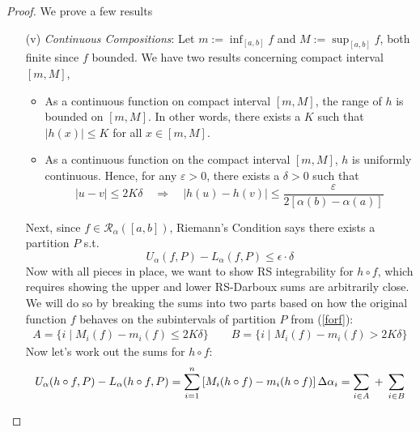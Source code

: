 \documentclass[12pt]{book}
\numberwithin{equation}{section} %
\theoremstyle{plain}
\theoremstyle{definition}
\theoremstyle{remark}
\begin{document}
\begin{proof}
We prove a few results
\begin{enumerate}[label=(\roman*)]
  \item[(v)]
    \emph{Continuous Compositions}:
    Let $m:=\inf_{[a,b]}f$ and $M:=\sup_{[a,b]}f$, both finite since $f$
    bounded. We have two results concerning compact interval $[m,M]$,
    \begin{itemize}
      \item As a continuous function on compact interval $[m,M]$,
        the range of $h$ is bounded on $[m,M]$. In other words, there
        exists a $K$ such that $|h(x)|\leq K$ for all $x\in[m,M]$.
      \item As a continuous function on the compact interval $[m,M]$,
        $h$ is uniformly continuous. Hence, for any $\varepsilon>0$,
        there exists a $\delta>0$ such that
        \begin{equation}
            \label{cont}
              |u- v| \leq 2K\delta \quad \Rightarrow
                \quad |h(u) - h(v)| \leq
                \frac{\varepsilon}{2\left[\alpha(b)-\alpha(a)
                \right]}
        \end{equation}
    \end{itemize}
    Next, since $f \in \mathscr{R}_\alpha([a,b])$, Riemann's Condition
    says there exists a partition $P$ s.t.
    \begin{equation}
        \label{forf}
          U_\alpha(f,P)- L_\alpha(f,P) \leq \epsilon\cdot
            \delta
    \end{equation}
    Now with all pieces in place, we want to show RS integrability for
    $h\circ f$, which requires showing the upper and lower
    RS-Darboux sums are arbitrarily close. We will do so by breaking the
    sums into two parts based on how the original function $f$ behaves
    on the subintervals of partition $P$ from (\ref{forf}):
    \begin{align*}
        A = \{ i \; | \; M_i(f) - m_i(f)\leq2K\delta\}
        \qquad
        B = \{ i \; | \; M_i(f) - m_i(f)>2K\delta\}
    \end{align*}
    Now let's work out the sums for $h\circ f$:
    \begin{align}
        U_\alpha(h\circ f,P) - L_\alpha(h\circ f,P)
            &= \sum^n_{i=1} \left[
            M_i(h\circ f) - m_i(h\circ f)\right]
            \Delta\alpha_i \notag
        = \sum_{i\in A} \; + \;
            \sum_{i\in B} \notag\\

\end{align}
\end{enumerate}
\end{proof}
\end{document}

